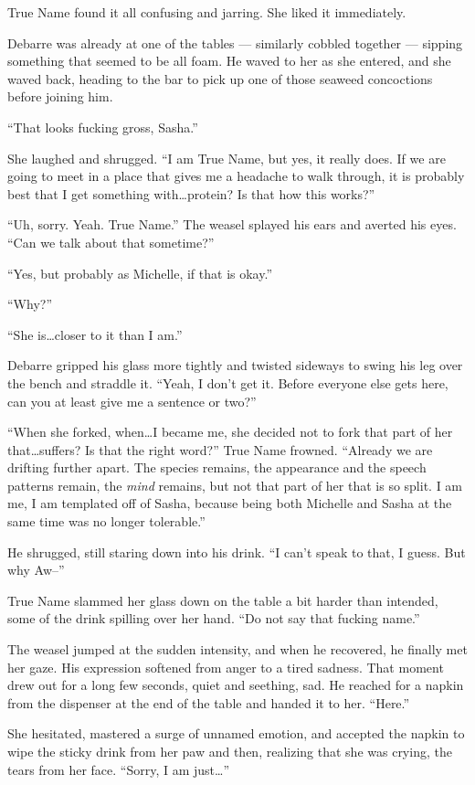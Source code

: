 True Name found it all confusing and jarring. She liked it immediately.

Debarre was already at one of the tables — similarly cobbled together — sipping something that seemed to be all foam. He waved to her as she entered, and she waved back, heading to the bar to pick up one of those seaweed concoctions before joining him.

``That looks fucking gross, Sasha.''

She laughed and shrugged. ``I am True Name, but yes, it really does. If we are going to meet in a place that gives me a headache to walk through, it is probably best that I get something with\ldots protein? Is that how this works?''

``Uh, sorry. Yeah. True Name.'' The weasel splayed his ears and averted his eyes. ``Can we talk about that sometime?''

``Yes, but probably as Michelle, if that is okay.''

``Why?''

``She is\ldots closer to it than I am.''

Debarre gripped his glass more tightly and twisted sideways to swing his leg over the bench and straddle it. ``Yeah, I don't get it. Before everyone else gets here, can you at least give me a sentence or two?''

``When she forked, when\ldots I became me, she decided not to fork that part of her that\ldots suffers? Is that the right word?'' True Name frowned. ``Already we are drifting further apart. The species remains, the appearance and the speech patterns remain, the \emph{mind} remains, but not that part of her that is so split. I am me, I am templated off of Sasha, because being both Michelle and Sasha at the same time was no longer tolerable.''

He shrugged, still staring down into his drink. ``I can't speak to that, I guess. But why Aw--''

True Name slammed her glass down on the table a bit harder than intended, some of the drink spilling over her hand. ``Do not say that fucking name.''

The weasel jumped at the sudden intensity, and when he recovered, he finally met her gaze. His expression softened from anger to a tired sadness. That moment drew out for a long few seconds, quiet and seething, sad. He reached for a napkin from the dispenser at the end of the table and handed it to her. ``Here.''

She hesitated, mastered a surge of unnamed emotion, and accepted the napkin to wipe the sticky drink from her paw and then, realizing that she was crying, the tears from her face. ``Sorry, I am just\ldots{}''


